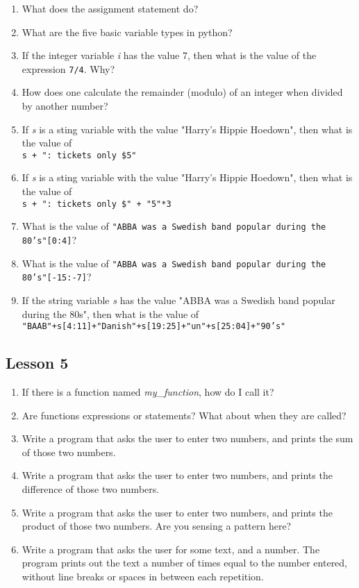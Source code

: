 \begin{enumerate}
	\item What does the assignment statement do?
	\item What are the five basic variable types in python?
	\item If the integer variable \textit{i} has the value 7, then what is    the value of the expression 
\texttt{7/4}. Why?
	\item How does one calculate the remainder (modulo) of an integer when    divided by another number?
	\item If \textit{s} is a sting variable with the value "Harry's Hippie    Hoedown", then what is the value of
\\
\texttt{s + ": tickets only    \$5"}
	\item If \textit{s} is a sting variable with the value "Harry's Hippie    Hoedown", then what is the value of
\\
\texttt{s + ": tickets only    \$" + "5"*3}
	\item What is the value of 
\texttt{"ABBA was a Swedish band popular during the    80's"[0:4]}?
	\item What is the value of 
\texttt{"ABBA was a Swedish band popular during the    80's"[-15:-7]}?
	\item If the string variable \textit{s} has the value "ABBA was a    Swedish band popular during the 80s", then what is the value of 
\\
\texttt{"BAAB"+s[4:11]+"Danish"+s[19:25]+"un"+s[25:04]+"90's"}
\end{enumerate}

\subsection{Lesson 5}

\begin{enumerate}
	\item If there is a function named \textit{my\_function}, how do I call    it?
	\item Are functions expressions or statements? What about when they    are called?
	\item Write a program that asks the user to enter two numbers, and    prints the sum of those two numbers.
	\item Write a program that asks the user to enter two numbers, and    prints the difference of those two numbers.
	\item Write a program that asks the user to enter two numbers, and    prints the product of those two numbers. Are you sensing a pattern    here?
	\item Write a program that asks the user for some text, and a number.    The program prints out the text a number of times equal to the    number entered, without line breaks or spaces in between each    repetition.
\end{enumerate}

